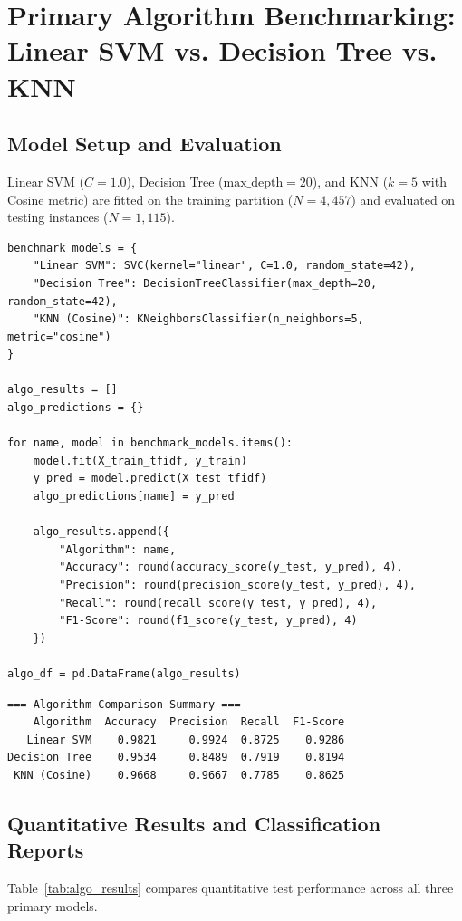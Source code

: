 \documentclass[12pt]{article}
\begin{document}
\newpage
\section{Primary Algorithm Benchmarking: Linear SVM vs. Decision Tree vs. KNN}

\subsection{Model Setup and Evaluation}
Linear SVM ($C=1.0$), Decision Tree ($\text{max\_depth}=20$), and KNN ($k=5$ with Cosine metric) are fitted on the training partition ($N=4,457$) and evaluated on testing instances ($N=1,115$).

\begin{lstlisting}[style=code]
benchmark_models = {
    "Linear SVM": SVC(kernel="linear", C=1.0, random_state=42),
    "Decision Tree": DecisionTreeClassifier(max_depth=20, random_state=42),
    "KNN (Cosine)": KNeighborsClassifier(n_neighbors=5, metric="cosine")
}

algo_results = []
algo_predictions = {}

for name, model in benchmark_models.items():
    model.fit(X_train_tfidf, y_train)
    y_pred = model.predict(X_test_tfidf)
    algo_predictions[name] = y_pred
    
    algo_results.append({
        "Algorithm": name,
        "Accuracy": round(accuracy_score(y_test, y_pred), 4),
        "Precision": round(precision_score(y_test, y_pred), 4),
        "Recall": round(recall_score(y_test, y_pred), 4),
        "F1-Score": round(f1_score(y_test, y_pred), 4)
    })

algo_df = pd.DataFrame(algo_results)
\end{lstlisting}

\begin{lstlisting}[style=output]
=== Algorithm Comparison Summary ===
    Algorithm  Accuracy  Precision  Recall  F1-Score
   Linear SVM    0.9821     0.9924  0.8725    0.9286
Decision Tree    0.9534     0.8489  0.7919    0.8194
 KNN (Cosine)    0.9668     0.9667  0.7785    0.8625
\end{lstlisting}

\subsection{Quantitative Results and Classification Reports}
Table~\ref{tab:algo_results} compares quantitative test performance across all three primary models.
\end{document}
